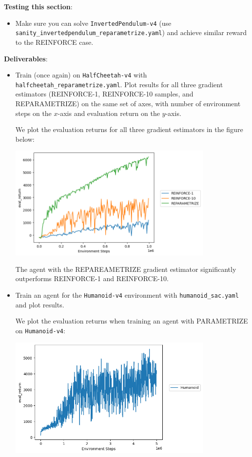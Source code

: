 \textbf{Testing this section}:
\begin{itemize}
    \item Make sure you can solve \verb|InvertedPendulum-v4| (use \verb|sanity_invertedpendulum_reparametrize.yaml|) and achieve similar reward to the REINFORCE case.
\end{itemize}

\textbf{Deliverables}: 
\begin{itemize}
    \item Train (once again) on \verb|HalfCheetah-v4| with \verb|halfcheetah_reparametrize.yaml|. Plot results for all three gradient estimators (REINFORCE-1, REINFORCE-10 samples, and REPARAMETRIZE) on the same set of axes, with number of environment steps on the $x$-axis and evaluation return on the $y$-axis.

    \begin{sol}
        We plot the evaluation returns for all three gradient estimators in the figure below:
            \begin{center}
                \includegraphics[width=4in]{../q3.1.4_halfcheetah.png}
            \end{center}
            The agent with the REPAREAMETRIZE gradient estimator significantly outperforms REINFORCE-1 and REINFORCE-10.
    \end{sol}

    \item Train an agent for the \verb|Humanoid-v4| environment with \verb|humanoid_sac.yaml| and plot results.

    \begin{sol}
        We plot the evaluation returns when training an agent with PARAMETRIZE on \texttt{Humanoid-v4}:
            \begin{center}
                \includegraphics[width=4in]{../q3.1.4_humanoid.png}
            \end{center}
    \end{sol}

\end{itemize}


